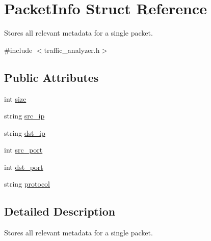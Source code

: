 \hypertarget{structPacketInfo}{\section{Packet\-Info Struct Reference}
\label{structPacketInfo}
}


Stores all relevant metadata for a single packet.  




{\ttfamily \#include $<$traffic\-\_\-analyzer.\-h$>$}

\subsection*{Public Attributes}
\begin{DoxyCompactItemize}
\item 
int \hyperlink{structPacketInfo_ac4fa3140b956f92ee7e76d325702327a}{size}
\item 
string \hyperlink{structPacketInfo_a020c9727f4f766c3927a49af904a1879}{src\-\_\-ip}
\item 
string \hyperlink{structPacketInfo_adbaddfdd6f5b8dba9f800026715af8c4}{dst\-\_\-ip}
\item 
int \hyperlink{structPacketInfo_a668e7df495d0a55fc1c8f67da13d80a3}{src\-\_\-port}
\item 
int \hyperlink{structPacketInfo_a6c7020347474289fb303f39e516d8fb6}{dst\-\_\-port}
\item 
string \hyperlink{structPacketInfo_a3a87fd54a7cc270d6156abcb838b23d2}{protocol}
\end{DoxyCompactItemize}


\subsection{Detailed Description}
Stores all relevant metadata for a single packet. 

